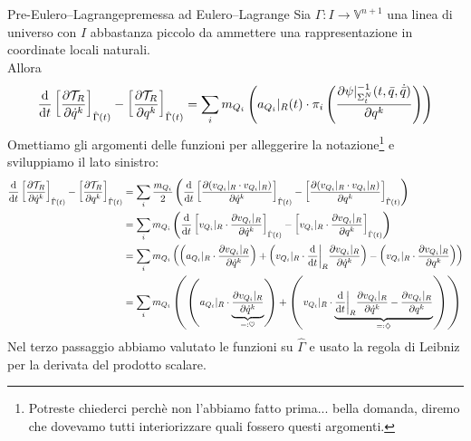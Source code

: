 \documentclass[openany]{book}
\renewcommand\V{\mathbb{V}}
\begin{document}
\begin{proposition}{Pre-Eulero--Lagrange}{premessa ad Eulero--Lagrange}
    Sia $\Gamma:I\to\V^{n+1}$ una linea di universo con $I$ abbastanza piccolo da ammettere una rappresentazione in coordinate locali naturali.\\
    Allora
    \[ \frac{\text{d}}{\text{d} t}\left[ \frac{\partial \mathcal{T}_R}{\partial \dot q^k} \right]_{\hat\Gamma(t)} - \left[ \frac{\partial \mathcal{T}_R}{\partial q^k} \right]_{\hat\Gamma(t)} = \sum_i m_{Q_i} \left( a_{Q_i}|_R(t)\cdot \pi_i\left( \frac{\partial \psi|_{\Sigma_t^N}^{-1}(t,\bar q,\dot{\bar q})}{\partial q^k} \right) \right) \]
    \proof 
    Omettiamo gli argomenti delle funzioni per alleggerire la notazione\footnote{Potreste chiederci perchè non l'abbiamo fatto prima... bella domanda, diremo che dovevamo tutti interiorizzare quali fossero questi argomenti.} e sviluppiamo il lato sinistro: 
    \begin{align*}
        \frac{\text{d}}{\text{d} t}\left[ \frac{\partial \mathcal{T}_R}{\partial \dot q^k} \right]_{\hat\Gamma(t)} - \left[ \frac{\partial \mathcal{T}_R}{\partial q^k} \right]_{\hat\Gamma(t)} & = \sum_i \frac{m_{Q_i}}{2} \left( \frac{\text{d}}{\text{d} t}\left[ \frac{\partial (v_{Q_i}|_R\cdot v_{Q_i}|_R) }{\partial \dot q^k} \right]_{\hat\Gamma(t)} - \left[ \frac{\partial (v_{Q_i}|_R\cdot v_{Q_i}|_R) }{\partial q^k} \right]_{\hat\Gamma(t)} \right) \\ 
        & = \sum_i m_{Q_i} \left( \frac{\text{d}}{\text{d} t} \left[ v_{Q_i}|_R\cdot \frac{\partial v_{Q_i}|_R }{\partial\dot q^k} \right]_{\hat\Gamma(t)} - \left[ v_{Q_i}|_R\cdot \frac{\partial v_{Q_i}|_R }{\partial q^k} \right]_{\hat\Gamma(t)} \right) \\ 
        & = \sum_i m_{Q_i} \left( \left(a_{Q_i}|_R \cdot \frac{\partial v_{Q_i}|_R}{\partial \dot q^k} \right) + \left( v_{Q_i}|_R \cdot \frac{\text{d}}{\text{d} t}\bigg|_R \frac{\partial v_{Q_i}|_R}{\partial \dot q^k} \right) - \left(v_{Q_i}|_R \cdot \frac{\partial v_{Q_i}|_R}{\partial q^k} \right) \right)\\
        & = \sum_i m_{Q_i}\left( \left(a_{Q_i}|_R \cdot \underbrace{\frac{\partial v_{Q_i}|_R}{\partial \dot q^k}}_{=: \heartsuit} \right) + \left( v_{Q_i}|_R \cdot \underbrace{\frac{\text{d}}{\text{d} t}\bigg|_R \frac{\partial v_{Q_i}|_R}{\partial \dot q^k} - \frac{\partial v_{Q_i}|_R}{\partial q^k}}_{=:\diamondsuit} \right) \right)
    \end{align*}
    Nel terzo passaggio abbiamo valutato le funzioni su $\hat\Gamma$ e usato la regola di Leibniz per la derivata del prodotto scalare.\\

\end{proposition}
\end{document}
